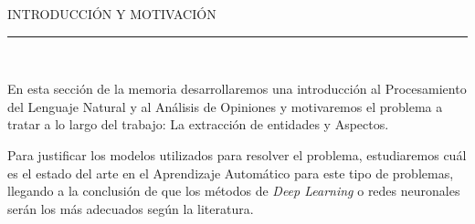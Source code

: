 
\begin{titlepage}
\begin{center}

\textsc{ \Large INTRODUCCIÓN Y MOTIVACIÓN\\[0.5cm]}
\noindent\rule[-1ex]{\textwidth}{3pt}\\[3.5ex]

\end{center}

\vspace{3cm}


\hspace{2.5cm} En esta sección de la memoria desarrollaremos una introducción al Procesamiento del Lenguaje Natural y al Análisis de Opiniones y motivaremos el problema a tratar a lo largo del trabajo: La extracción de entidades y Aspectos.

Para justificar los modelos utilizados para resolver el problema, estudiaremos cuál es el estado del arte en el Aprendizaje Automático para este tipo de problemas, llegando a la conclusión de que los métodos de \textit{Deep Learning} o redes neuronales serán los más adecuados según la literatura.

\end{titlepage}

